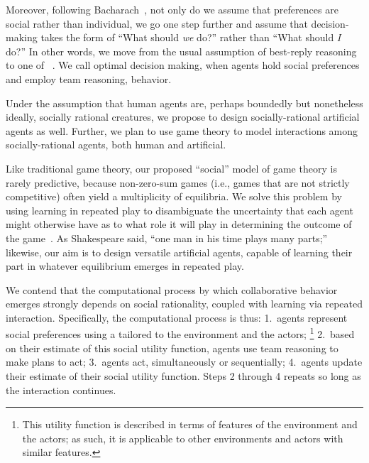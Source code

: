 Moreover, following Bacharach~\cite{2006}, not only do we assume that
preferences are social rather than individual, we go one step further
and assume that decision-making takes the form of ``What should
\emph{we\/} do?'' rather than ``What should \emph{I\/} do?''  In other
words, we move from the usual assumption of best-reply reasoning to
one of ~\cite{TEAM REASONING: Bacharach 1999}.
We call optimal decision making, when agents hold social preferences
and employ team reasoning,  behavior.

Under the assumption that human agents are, perhaps boundedly but
nonetheless ideally, socially rational creatures, we propose to design
socially-rational artificial agents as well.  Further, we plan to use
game theory to model interactions among socially-rational agents, both
human and artificial.

Like traditional game theory, our proposed ``social'' model of game
theory is rarely predictive, because non-zero-sum games (i.e., games
that are not strictly competitive) often yield a multiplicity of
equilibria.  We solve this problem by using learning in repeated play
to disambiguate the uncertainty that each agent might otherwise have
as to what role it will play in determining the outcome of the
game~\cite{add citations of learning as eqm selection}.  As
Shakespeare said, ``one man in his time plays many parts;'' likewise,
our aim is to design versatile artificial agents, capable of learning
their part in whatever equilibrium emerges in repeated play.

We contend that the computational process by which collaborative
behavior emerges strongly depends on social rationality, coupled with
learning via repeated interaction.
%
Specifically, the computational process is thus:
1.~agents represent social preferences using a 
tailored to the environment and the actors;%
\footnote{This utility function is described in terms of features of the environment and the actors;
as such, it is applicable to other environments and actors with similar features.}
2.~based on their estimate of this social utility function, agents use team reasoning to make plans to act;
3.~agents act, simultaneously or sequentially;
4.~agents update their estimate of their social utility function.
Steps 2 through 4 repeats so long as the interaction continues.

